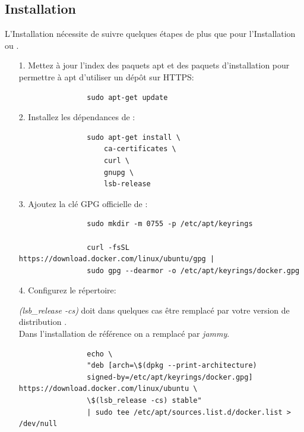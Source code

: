 \subsection[Installation Linux]{Installation \linux{}\label{sec:installation_linux}}

    L'Installation \linux{} nécessite de suivre quelques étapes de plus que pour l'Installation \macos{} ou \windows{}.\\
    \begin{itemize}
    
        \item[1.] Mettez à jour l'index des paquets apt et des paquets d'installation pour permettre à apt d'utiliser un dépôt sur HTTPS:
        
            \begin{lstlisting}
                sudo apt-get update
            \end{lstlisting}

        \item[2.] Installez les dépendances de \docker{}:

            \begin{lstlisting}
                sudo apt-get install \
                    ca-certificates \
                    curl \
                    gnupg \
                    lsb-release
            \end{lstlisting}

        \item[3.] Ajoutez la clé GPG officielle de \docker{}:

            \begin{lstlisting}
                sudo mkdir -m 0755 -p /etc/apt/keyrings

                curl -fsSL https://download.docker.com/linux/ubuntu/gpg | 
                sudo gpg --dearmor -o /etc/apt/keyrings/docker.gpg
            \end{lstlisting}

        \item[4.] Configurez le répertoire:\\

            \begin{footnotesize}
                \textit{\textdollar(lsb\_release -cs)} doit dans quelques cas être remplacé par votre version de distribution \linux{}.\\
                Dans l'installation de référence on a remplacé par \textit{jammy}.
            \end{footnotesize}
            \begin{lstlisting}
                echo \
                "deb [arch=\$(dpkg --print-architecture) 
                signed-by=/etc/apt/keyrings/docker.gpg] https://download.docker.com/linux/ubuntu \
                \$(lsb_release -cs) stable" 
                | sudo tee /etc/apt/sources.list.d/docker.list > /dev/null
            \end{lstlisting}


\end{itemize}

